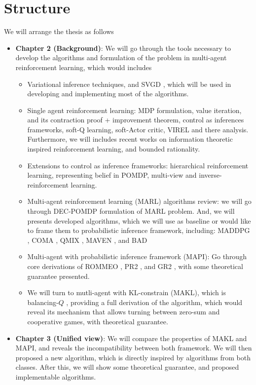\section{Structure}
We will arrange the thesis as follows
\begin{itemize}
    \item \textbf{Chapter 2 (Background)}: We will go through the tools necessary to develop the algorithms and formulation of the problem in multi-agent reinforcement learning, which would includes 
    \begin{itemize}
        \item Variational inference techniques, and SVGD \cite{liu2016stein}, which will be used in developing and implementing most of the algorithms.
        \item Single agent reinforcement learning: MDP formulation, value iteration, and its contraction proof + improvement theorem, control as inferences frameworks, soft-Q learning, soft-Actor critic, VIREL and there analysis. Furthermore, we will includes recent works on information theoretic inspired reinforcement learning, and bounded rationality. 
        \item Extensions to control as inference frameworks: hierarchical reinforcement learning, representing belief in POMDP, multi-view and inverse-reinforcement learning. 
        \item Multi-agent reinforcement learning (MARL) algorithms review: we will go through DEC-POMDP \cite{bernstein2002complexity} formulation of MARL problem. And, we will presents developed algorithms, which we will use as baseline or would like to frame them to probabilistic inference framework, including: MADDPG \cite{lowe2017multi}, COMA \cite{foerster2018counterfactual}, QMIX \cite{rashid2018qmix}, MAVEN \cite{mahajan2019maven}, and BAD \cite{foerster2018bayesian}
        \item Multi-agent with probabilistic inference framework (MAPI): Go through core derivations of ROMMEO \cite{tian2019regularized}, PR2 \cite{wen2019probabilistic}, and GR2  \cite{wen2019multi}, with some theoretical guarantee presented.
        \item We will turn to mutli-agent with KL-constrain (MAKL), which is balancing-$Q$ \cite{grau2018balancing}, providing a full derivation of the algorithm, which would reveal its mechanism that allows turning between zero-sum and cooperative games, with theoretical guarantee. 
    \end{itemize}
    \item \textbf{Chapter 3 (Unified view)}: We will compare the properties of MAKL and MAPI, and reveals the incompatibility between both framework. We will then proposed a new algorithm, which is directly inspired by algorithms from both classes. After this, we will show some theoretical guarantee, and proposed implementable algorithms.

\end{itemize}

